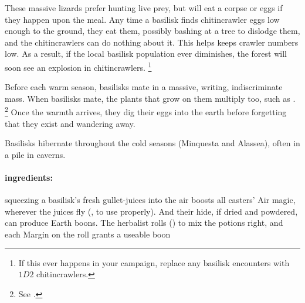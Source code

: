 \begin{multicols}{2}
These massive lizards prefer hunting live prey, but will eat a corpse or eggs if they happen upon the meal.
Any time a basilisk finds chitincrawler eggs low enough to the ground, they eat them, possibly bashing at a tree to dislodge them, and the chitincrawlers can do nothing about it.
This helps keeps crawler numbers low.
As a result, if the local basilisk population ever diminishes, the forest will soon see an explosion in chitincrawlers.%
\footnote{If this ever happens in your campaign, replace any basilisk encounters with $1D2$ chitincrawlers.}

Before each warm season, basilisks mate in a massive, writing, indiscriminate mass.
When basilisks mate, the plants that grow on them multiply too, such as .%
\footnote{See .}
Once the warmth arrives, they dig their eggs into the earth before forgetting that they exist and wandering away.

Basilisks hibernate throughout the cold seasons (\gls{Minquesta} and \gls{Alassea}), often in a pile in caverns.

\paragraph{\Glspl{ingredient}:}
squeezing a basilisk's fresh gullet-juices into the air boosts all casters' Air magic, wherever the juices fly (, \tn[10] to use properly).
And their hide, if dried and powdered, can produce Earth \glspl{boon}.
The herbalist rolls  (\tn[10]) to mix the potions right, and each Margin on the roll grants a useable \gls{boon}

\showEnc


\end{multicols}
